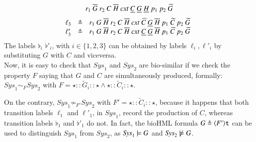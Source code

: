 {\[\begin{array}{lcl@{\hspace{0.3cm}} lcl}
r_1~\overline{G}~r_2~C~\overline{H}~\mathit{cxt}~\underline{C}~\underline{G}~\underline{H}~p_1~p_2~\widetilde{G}
\end{array}
\]
\[
\begin{array}{lcl @{\hspace{0.3cm}}lcl}
\ell_3 & \defeq & 
r_1~G~\overline{H}~r_2~C~\overline{H}~\mathit{cxt}~\widehat{C}~\underline{G}~\overline{H}~p_1~\widetilde{C}~p_2~\widetilde{G}
\\
\ell'_3 & \defeq & r_1~G~\overline{H}~r_2~C~\overline{H}~\mathit{cxt}~\underline{C}~\underline{G}~\overline{H}~p_1~\widetilde{C}~p_2~\widetilde{G}
\end{array}
\]
}
The labels $\flat_i$ $\flat'_i$, with $i \in \{1,2,3\}$ can be obtained by labels $\ell_i,\ell'_i$ by substituting $G$ with $C$ and viceversa.
\\
Now, it is easy to check that $\mathit{Sys}_1$ and $\mathit{Sys}_2$ are bio-similar if we check the property $F$ saying that $G$ and $C$ are simultaneously  produced,
formally:
$\mathit{Sys}_1 \sim_F \mathit{Sys}_2$ with $F= \star :: \widetilde{G}_i :: \star \wedge  \star :: \widetilde{C}_i :: \star $.

On the contrary, $\mathit{Sys}_1 \not \sim_{F'} \mathit{Sys}_2$  with $F' =  \star :: \widetilde{C}_i :: \star $, 
because it happens that both  transition labels $\ell_1$  and $\ell'_1$, in $\mathit{Sys}_1$, record the production of $C$, whereas 
transition labels $\flat_1$ and $\flat'_1$ do not.
In fact, the bioHML formula $G\triangleq \langle F'\rangle{\tt t}$ can be used to distinguish $\mathit{Sys}_1$ from $\mathit{Sys}_2$, as $\mathit{Sys}_1\models G$ and $\mathit{Sys}_2\not\models G$.

